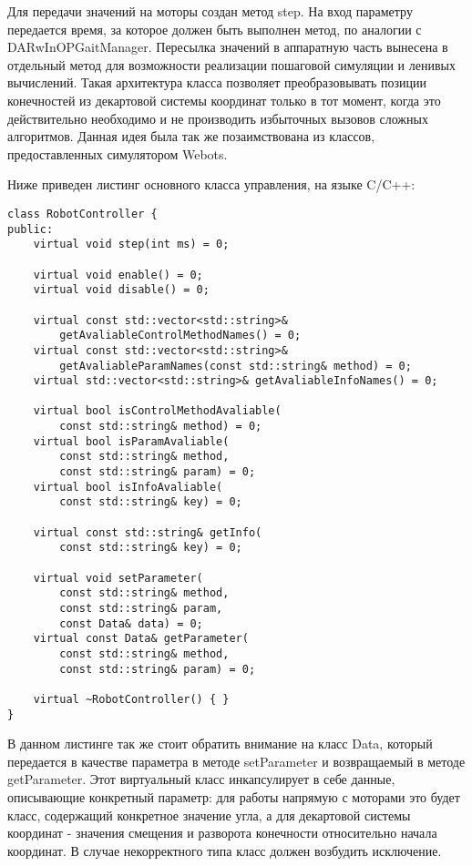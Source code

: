 Для передачи значений на моторы создан метод step. На вход параметру передается время, за которое должен быть выполнен метод, по аналогии с DARwInOPGaitManager. Пересылка значений в аппаратную часть вынесена в отдельный метод для возможности реализации пошаговой симуляции и ленивых вычислений. Такая архитектура класса позволяет преобразовывать позиции конечностей из декартовой системы координат только в тот момент, когда это действительно необходимо и не производить избыточных вызовов сложных алгоритмов. Данная идея была так же позаимствована из классов, предоставленных симулятором Webots.

Ниже приведен листинг основного класса управления, на языке C/C++:

\lstset{language=C++}
\begin{lstlisting}
class RobotController {
public:
    virtual void step(int ms) = 0;

    virtual void enable() = 0;
    virtual void disable() = 0;

    virtual const std::vector<std::string>&
        getAvaliableControlMethodNames() = 0;
    virtual const std::vector<std::string>&
        getAvaliableParamNames(const std::string& method) = 0;
    virtual std::vector<std::string>& getAvaliableInfoNames() = 0;
    
    virtual bool isControlMethodAvaliable(
        const std::string& method) = 0;
    virtual bool isParamAvaliable(
        const std::string& method,
        const std::string& param) = 0;
    virtual bool isInfoAvaliable(
        const std::string& key) = 0;
    
    virtual const std::string& getInfo(
        const std::string& key) = 0;
        
    virtual void setParameter(
        const std::string& method,
        const std::string& param,
        const Data& data) = 0;
    virtual const Data& getParameter(
        const std::string& method,
        const std::string& param) = 0;
    
    virtual ~RobotController() { }
}
\end{lstlisting}

В данном листинге так же стоит обратить внимание на класс Data, который передается в качестве параметра в методе setParameter и возвращаемый в методе getParameter. Этот виртуальный класс инкапсулирует в себе данные, описывающие конкретный параметр: для работы напрямую с моторами это будет класс, содержащий конкретное значение угла, а для декартовой системы координат - значения смещения и разворота конечности относительно начала координат. В случае некорректного типа класс должен возбудить исключение.

